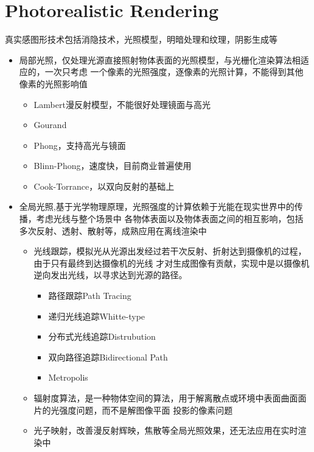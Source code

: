 \section{Photorealistic Rendering}

真实感图形技术包括消隐技术，光照模型，明暗处理和纹理，阴影生成等

\begin{itemize}
    \item {局部光照，仅处理光源直接照射物体表面的光照模型，与光栅化渲染算法相适应的，一次只考虑
    一个像素的光照强度，逐像素的光照计算，不能得到其他像素的光照影响值}
    \begin{itemize}
        \item {Lambert漫反射模型，不能很好处理镜面与高光}
        \item {Gourand}
        \item {Phong，支持高光与镜面}
        \item {Blinn-Phong，速度快，目前商业普遍使用}
        \item {Cook-Torrance，以双向反射的基础上}
    \end{itemize}
    \item {全局光照,基于光学物理原理，光照强度的计算依赖于光能在现实世界中的传播，考虑光线与整个场景中
    各物体表面以及物体表面之间的相互影响，包括多次反射、透射、散射等，成熟应用在离线渲染中}
    \begin{itemize}
        \item {光线跟踪，模拟光从光源出发经过若干次反射、折射达到摄像机的过程，由于只有最终到达摄像机的光线
        才对生成图像有贡献，实现中是以摄像机逆向发出光线，以寻求达到光源的路径。}
        \begin{itemize}
            \item {路径跟踪Path Tracing}
            \item {递归光线追踪Whitte-type}
            \item {分布式光线追踪Distrubution}
            \item {双向路径追踪Bidirectional Path}
            \item {Metropolis}
        \end{itemize}
        \item {辐射度算法，是一种物体空间的算法，用于解离散点或环境中表面曲面面片的光强度问题，而不是解图像平面
        投影的像素问题}
        \item {光子映射，改善漫反射辉映，焦散等全局光照效果，还无法应用在实时渲染中}
    \end{itemize}
\end{itemize}

